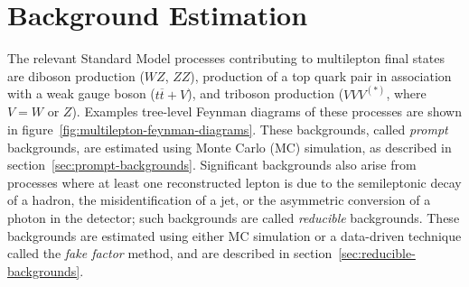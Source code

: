 \chapter{Background Estimation}\label{ch:backgrounds}
The relevant Standard Model processes contributing to multilepton final states are diboson production ($WZ$, $ZZ$), production of a top quark pair in association with a weak gauge boson ($t\overline{t}+V$), and triboson production ($VVV^{(*)}$, where $V=W$ or $Z$). Examples tree-level Feynman diagrams of these processes are shown in figure~\ref{fig:multilepton-feynman-diagrams}. These backgrounds, called \emph{prompt} backgrounds, are estimated using Monte Carlo (MC) simulation, as described in section~\ref{sec:prompt-backgrounds}. Significant backgrounds also arise from processes where at least one reconstructed lepton is due to the semileptonic decay of a hadron, the misidentification of a jet, or the asymmetric conversion of a photon in the detector; such backgrounds are called \emph{reducible} backgrounds. These backgrounds are estimated using either MC simulation or a data-driven technique called the \emph{fake factor} method, and are described in section~\ref{sec:reducible-backgrounds}. 


